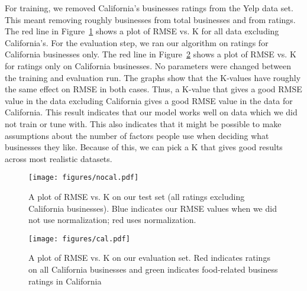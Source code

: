 For training, we removed California's businesses ratings from the Yelp data
set. This meant removing roughly \numBusCA businesses from \numBusTotal total
businesses and \numRatingCA from \numRatingTotal ratings.
The red line in Figure~\ref{fig:nocal} shows a plot of RMSE vs. K for all data excluding
California's. For the evaluation step, we ran our algorithm on ratings for
California businesses only. The red line in Figure~\ref{fig:cal} shows a plot of RMSE vs. K for
ratings only on California businesses. No parameters were changed between the
training and evaluation run. The graphs show that the K-values have roughly the
same effect on RMSE in both cases. Thus, a K-value that gives a good RMSE value
in the data excluding California gives a good RMSE value in the data for
California. This result indicates that our model works well on
data which we did not train or tune with. This also indicates that it might be
possible to make assumptions about the number of factors people use when
deciding what businesses they like. Because of this, we can
pick a K that gives good results across most realistic datasets.

\begin{figure}[ht!]
	\centering
	\texttt{[image: figures/nocal.pdf]}
	\caption[]{A plot of RMSE vs. K on our test set (all ratings excluding California businesses). Blue indicates our RMSE values when we did not use normalization; red uses normalization.}
	\label{fig:nocal}
\end{figure}


\begin{figure}[ht!]
	\centering
	\texttt{[image: figures/cal.pdf]}
	\caption[]{A plot of RMSE vs. K on our evaluation set. Red indicates ratings on all California businesses and green indicates food-related business ratings in California}
	\label{fig:cal}
\end{figure}



